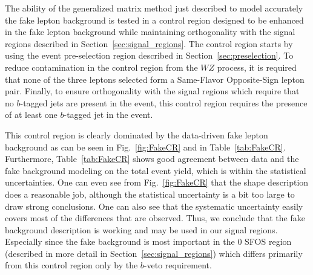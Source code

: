 The ability of the generalized matrix method just described to model accurately
the fake lepton background is tested in a control region designed to be enhanced
in the fake lepton background while maintaining orthogonality with the signal
regions described in Section~\ref{sec:signal_regions}. The control region 
starts by using the event pre-selection region described in Section~\ref{sec:preselection}. To reduce contamination in the 
control region from the $WZ$ process, it is required that none
of the three leptons selected form a Same-Flavor Opposite-Sign lepton pair.
Finally, to ensure orthogonality with the signal regions which require that no
$b$-tagged jets are present in the event, this control region requires
the presence of at least one $b$-tagged jet in the event. 

This control region
is clearly dominated by the data-driven fake lepton background as can
be seen in Fig.~\ref{fig:FakeCR} and in Table~\ref{tab:FakeCR}. 
Furthermore, Table~\ref{tab:FakeCR} shows good agreement between data
and the fake background modeling on the total event yield, which is within 
the statistical uncertainties.  One can even see from
Fig.~\ref{fig:FakeCR} that the shape description does a reasonable job,
although the statistical uncertainty is a bit too large to draw strong conclusions.
One can also see that the systematic uncertainty easily covers most
of the differences that are observed. Thus, we conclude that the fake background
description is working and may be used in our signal regions.  Especially since
the fake background is most important in the 0 SFOS region (described in more
detail in Section~\ref{sec:signal_regions}) which differs primarily from this
control region only by the $b$-veto requirement.




